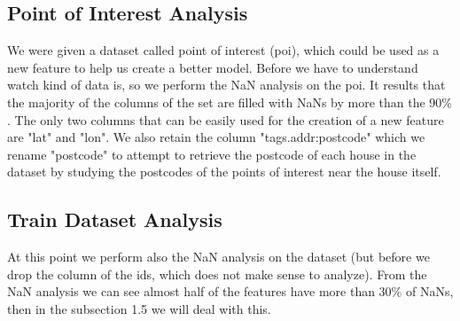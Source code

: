\documentclass[10pt, notitlepage]{article}
\begin{document}
\color{blue}
\subsection{Point of Interest Analysis}
\color{black}
We were given a dataset called point of interest (poi), which could be used as a new feature to help us create a better model. Before we have to understand watch kind of data is, so we perform the NaN analysis on the poi. It results that the majority of the columns of the set are filled with NaNs by more than the 90\% . The only  two columns that can be easily used for the creation of a new feature are "lat" and "lon". We also retain the column "tags.addr:postcode" which we rename "postcode" to attempt to retrieve the postcode of each house in the dataset by studying the postcodes of the points of interest near the house itself.

\color{blue}
\subsection{Train Dataset Analysis}
\color{black}
At this point we perform also the NaN analysis on the dataset (but before we drop the column of the ids, which does not make sense to analyze). From the NaN analysis we can see almost half of the features have more than 30\% of NaNs, then in the subsection 1.5 we will deal with this. 

\color{blue}
\end{document}
